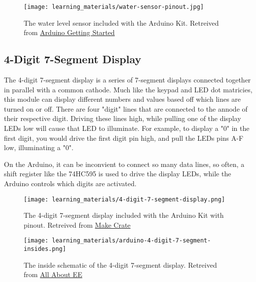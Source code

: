     \begin{figure}[h!]
        \texttt{[image: learning\_materials/water-sensor-pinout.jpg]}
        \caption[Water Level Sensor]{The water level sensor included with the Arduino Kit. 
        Retreived from \href{https://arduinogetstarted.com/images/tutorial/water-sensor-pinout.jpg}
        {Arduino Getting Started}}
    \end{figure}

    \subsection*{4-Digit 7-Segment Display}
    The 4-digit 7-segment display is a series of 7-segment displays connected together in parallel with a common cathode.
    Much like the keypad and LED dot matricies, this module can display different numbers and values based off which lines are turned on or off.
    There are four "digit" lines that are connected to the annode of their respective digit.
    Driving these lines high, while pulling one of the display LEDs low will cause that LED to illuminate.
    For example, to display a "0" in the first digit, you would drive the first digit pin high, and pull the LEDs pins A-F low, illuminating a "0".

    On the Arduino, it can be inconvient to connect so many data lines, so often, a shift register like the 74HC595 is used to drive the display LEDs, while the Arduino controls which digits are activated.

    \begin{figure}[h!]
        \texttt{[image: learning\_materials/4-digit-7-segment-display.png]}
        \caption[4-Digit 7-Segment]{The 4-digit 7-segment display included with the Arduino Kit with pinout. 
        Retreived from \href{https://i.ytimg.com/vi/fYAlE1u5rno/maxresdefault.jpg}
        {Make Crate}}
    \end{figure}

    \begin{figure*}[b]
        \texttt{[image: learning\_materials/arduino-4-digit-7-segment-insides.png]}
        \caption[4-Digit 7-Segment Schematic]{The inside schematic of the 4-digit 7-segment display. 
        Retreived from \href{https://lh6.googleusercontent.com/-UVNbhMgaoc4/Thh-bH7d5zI/AAAAAAAAAEQ/FphoqjmYsVg/s800/arduino-4-digit-7-segment-insides.png}
        {All About EE}}
    \end{figure*}
